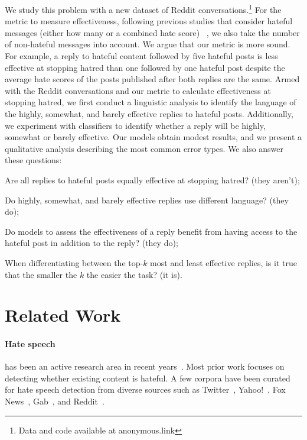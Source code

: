 \documentclass[11pt]{article}
\begin{document}
We study this problem with a new dataset of Reddit conversations.\footnote{Data and code available at anonymous.link}
For the metric to measure effectiveness, 
following previous studies that consider hateful messages (either how many or a combined hate score) ~\cite{DBLP:conf/icwsm/LiuGHC18,DBLP:conf/kdd/DahiyaSSGCEMB021,garland2022impact}, we also take the number of non-hateful messages into account.
We argue that our metric is more sound.
For example, a reply to hateful content 
followed by five hateful posts is less effective at stopping hatred than one followed by one hateful post
despite the average hate scores of the posts published after both replies are the same.
Armed with the Reddit conversations and our metric to calculate effectiveness at stopping hatred,
we first conduct a linguistic analysis to identify the language of the highly, somewhat, and barely effective replies to hateful posts.
Additionally, we experiment with classifiers to identify whether a reply will be highly, somewhat or barely effective.
Our models obtain modest results,
and we present a qualitative analysis describing the most common error types.
We also answer these questions:
\begin{compactenum}
	\item Are all replies to hateful posts equally effective at stopping hatred? (they aren't);
	\item Do highly, somewhat, and barely effective replies use different language? (they do);
	\item Do models to assess the effectiveness of a reply benefit from having access to the hateful post in addition to the reply? (they do);
	\item When differentiating between the top-$k$ most and least effective replies,
	is it true that the smaller the $k$ the easier the task? (it is).
\end{compactenum}


\section{Related Work}
\label{s:related_work}
\paragraph{Hate speech}
has been an active research area in recent years~\cite{fortuna2018survey}. 
Most prior work focuses on detecting whether existing content is hateful.
A few corpora have been curated for hate speech detection from diverse sources such as
Twitter~\cite{waseem-hovy-2016-hateful, hateoffensive},
Yahoo!~\cite{nobata2016abusive},
Fox News~\cite{gao-huang-2017-detecting},
Gab~\cite{DBLP:conf/aaai/MathewSYBG021},
and Reddit~\cite{qian-etal-2019-benchmark}.
\end{document}

